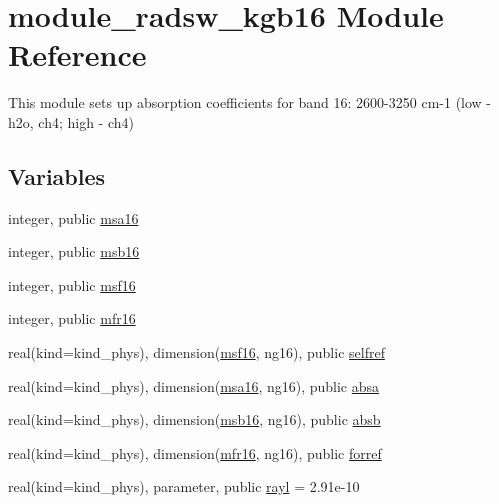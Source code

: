 \hypertarget{namespacemodule__radsw__kgb16}{}\section{module\+\_\+radsw\+\_\+kgb16 Module Reference}
\label{namespacemodule__radsw__kgb16}


This module sets up absorption coefficients for band 16\+: 2600-\/3250 cm-\/1 (low -\/ h2o, ch4; high -\/ ch4)  


\subsection*{Variables}
\begin{DoxyCompactItemize}
\item 
integer, public \hyperlink{namespacemodule__radsw__kgb16_ad76a9d79e77228ac93ec3db96eed2b29}{msa16}
\item 
integer, public \hyperlink{namespacemodule__radsw__kgb16_a2ce1ab36897fb1fc7d85cbf7fe539e59}{msb16}
\item 
integer, public \hyperlink{namespacemodule__radsw__kgb16_ab35df3f7d231e98fbef5738119138907}{msf16}
\item 
integer, public \hyperlink{namespacemodule__radsw__kgb16_aeee3fe8e44f6fbd9a6a008bc9f97f37c}{mfr16}
\item 
real(kind=kind\+\_\+phys), dimension(\hyperlink{namespacemodule__radsw__kgb16_ab35df3f7d231e98fbef5738119138907}{msf16}, ng16), public \hyperlink{namespacemodule__radsw__kgb16_a77d98f3fb766d4abfd494332ce67c2c2}{selfref}
\item 
real(kind=kind\+\_\+phys), dimension(\hyperlink{namespacemodule__radsw__kgb16_ad76a9d79e77228ac93ec3db96eed2b29}{msa16}, ng16), public \hyperlink{namespacemodule__radsw__kgb16_a51fe40b5f24cc461850fe5be40d18869}{absa}
\item 
real(kind=kind\+\_\+phys), dimension(\hyperlink{namespacemodule__radsw__kgb16_a2ce1ab36897fb1fc7d85cbf7fe539e59}{msb16}, ng16), public \hyperlink{namespacemodule__radsw__kgb16_afe8639128e4f7a48f133b7399addcb79}{absb}
\item 
real(kind=kind\+\_\+phys), dimension(\hyperlink{namespacemodule__radsw__kgb16_aeee3fe8e44f6fbd9a6a008bc9f97f37c}{mfr16}, ng16), public \hyperlink{namespacemodule__radsw__kgb16_a8e8cf110f56c7d4253c63bbf607be34c}{forref}
\item 
real(kind=kind\+\_\+phys), parameter, public \hyperlink{namespacemodule__radsw__kgb16_a27964e0300eb686acf1ed3c8459d3810}{rayl} = 2.\+91e-\/10
\end{DoxyCompactItemize}


